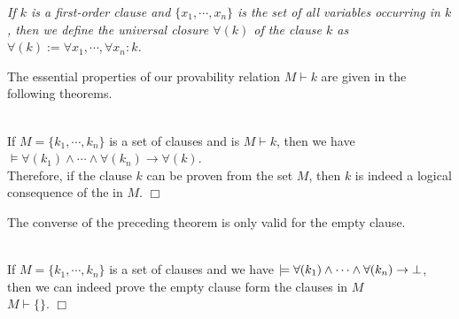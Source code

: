 \begin{Definition}
{\em
  If $k$ is a first-order clause and  $\{x_1,\cdots,x_n\}$ is the set of all variables occurring in  $k$,
  then we define the \emph{universal closure}  $\forall(k)$  of the clause $k$ as \\[0.2cm]
  \hspace*{1.3cm} $\forall(k) := \forall x_1, \cdots,\forall x_n \colon k$.
}
\end{Definition}

\noindent
The essential properties of our provability relation  $M \vdash k$ are given in the following theorems.

\begin{Proposition}[Correctness] \hspace*{\fill} \\
If $M = \{k_1,\cdots,k_n\}$ is a set of clauses and is  $M \vdash k$, then we have \\[0.2cm]
\hspace*{1.3cm}
$\models \forall(k_1) \wedge \cdots \wedge \forall(k_n) \rightarrow \forall(k)$. 
\\[0.2cm]
Therefore, if the clause $k$ can be proven from the set $M$,  then $k$ is indeed a logical consequence 
of the \formulae in  $M$.
\hspace*{\fill} $\Box$
\end{Proposition}

\noindent
The converse of the preceding theorem is only valid for the empty clause.
\begin{Proposition} \hspace*{\fill} \\
If $M = \{k_1,\cdots,k_n\}$ is a set of clauses and we have  
$\models \forall(k_1) \wedge \cdots \wedge \forall(k_n) \rightarrow \bot$, then we can indeed prove
the empty clause form the clauses in $M$ \\[0.2cm]
\hspace*{1.3cm} $M \vdash \{\}$.
  \hspace*{\fill} $\Box$
\end{Proposition}

